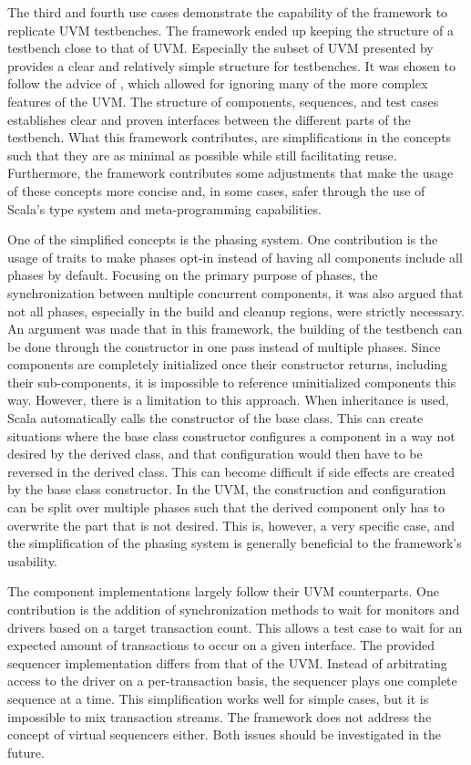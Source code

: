 The third and fourth use cases demonstrate the capability of the framework to replicate UVM testbenches. The framework ended up keeping the structure of a testbench close to that of UVM. Especially the subset of UVM presented by \citeauthor{sutherland2015uvm} \cite{sutherland2015uvm} provides a clear and relatively simple structure for testbenches. It was chosen to follow the advice of \cite{sutherland2015uvm}, which allowed for ignoring many of the more complex features of the UVM. The structure of components, sequences, and test cases establishes clear and proven interfaces between the different parts of the testbench. What this framework contributes, are simplifications in the concepts such that they are as minimal as possible while still facilitating reuse. Furthermore, the framework contributes some adjustments that make the usage of these concepts more concise and, in some cases, safer through the use of Scala's type system and meta-programming capabilities.

One of the simplified concepts is the phasing system. One contribution is the usage of traits to make phases opt-in instead of having all components include all phases by default. Focusing on the primary purpose of phases, the synchronization between multiple concurrent components, it was also argued that not all phases, especially in the build and cleanup regions, were strictly necessary. An argument was made that in this framework, the building of the testbench can be done through the constructor in one pass instead of multiple phases. Since components are completely initialized once their constructor returns, including their sub-components, it is impossible to reference uninitialized components this way. However, there is a limitation to this approach. When inheritance is used, Scala automatically calls the constructor of the base class. This can create situations where the base class constructor configures a component in a way not desired by the derived class, and that configuration would then have to be reversed in the derived class. This can become difficult if side effects are created by the base class constructor. In the UVM, the construction and configuration can be split over multiple phases such that the derived component only has to overwrite the part that is not desired. This is, however, a very specific case, and the simplification of the phasing system is generally beneficial to the framework's usability. 

The component implementations largely follow their UVM counterparts. One contribution is the addition of synchronization methods to wait for monitors and drivers based on a target transaction count. This allows a test case to wait for an expected amount of transactions to occur on a given interface. The provided sequencer implementation differs from that of the UVM. Instead of arbitrating access to the driver on a per-transaction basis, the sequencer plays one complete sequence at a time. This simplification works well for simple cases, but it is impossible to mix transaction streams. The framework does not address the concept of virtual sequencers either. Both issues should be investigated in the future. 

